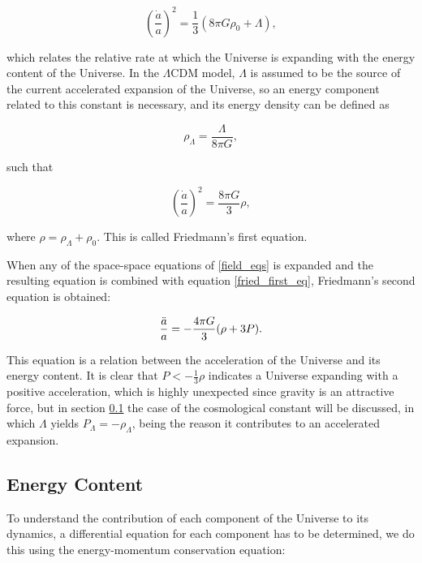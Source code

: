 \documentclass[openany,a4paper,12pt,oneside]{book}
\begin{document}
\begin{spacing}{1.5}
\begin{equation}\label{fried1_step1}
    \left(\frac{\dot{a}}{a}\right)^2=\frac{1}{3}\left(8\pi G\rho_0+\Lambda\right),
\end{equation}

\noindent which relates the relative rate at which the Universe is expanding with the energy content of the Universe. In the $\Lambda$CDM model, $\Lambda$ is assumed to be the source of the current accelerated expansion of the Universe, so an energy component related to this constant is necessary, and its energy density can be defined as

\begin{equation}\label{def:rho_lambda}
    \rho_\Lambda=\frac{\Lambda}{8\pi G},
\end{equation}

\noindent such that

\begin{equation}\label{fried_first_eq}
    \left(\frac{\dot{a}}{a}\right)^2=\frac{8\pi G}{3}\rho,
\end{equation}

\noindent where $\rho=\rho_\Lambda+\rho_0$. This is called Friedmann's first equation. 

When any of the space-space equations of \eqref{field_eqs} is expanded and the resulting equation is combined with equation \eqref{fried_first_eq}, Friedmann's second equation is obtained:

\begin{equation}\label{fried_second_eq}
    \frac{\Ddot{a}}{a}=-\frac{4\pi G}{3}(\rho+3P).
\end{equation}

This equation is a relation between the acceleration of the Universe and its energy content. It is clear that $P<-\frac{1}{3}\rho$ indicates a Universe expanding with a positive acceleration, which is highly unexpected since gravity is an attractive force, but in section \ref{subsect:Ch2_Energy_Content} the case of the cosmological constant will be discussed, in which $\Lambda$ yields $P_\Lambda=-\rho_\Lambda$, being the reason it contributes to an accelerated expansion.

\subsection{Energy Content}\label{subsect:Ch2_Energy_Content}

To understand the contribution of each component of the Universe to its dynamics, a differential equation for each component has to be determined, we do this using the energy-momentum conservation equation:


\end{spacing}
\end{document}
